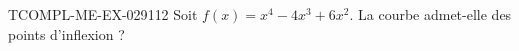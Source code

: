 \begin{exercice}{TCOMPL-ME-EX-029}{1}{12}
Soit $f(x) = x^4 - 4x^3 + 6x^2$. La courbe admet-elle des points d'inflexion ?

\end{exercice}
